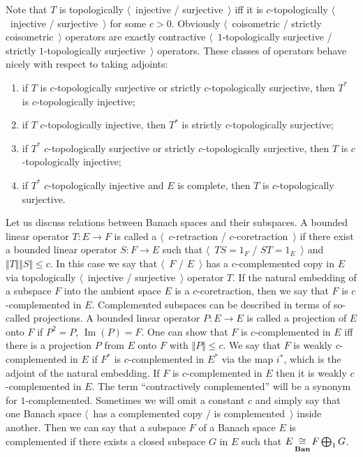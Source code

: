 Note that $T$ is topologically $\langle$~injective / surjective~$\rangle$ iff it
is $c$-topologically $\langle$~injective / surjective~$\rangle$ for some $c>0$.
Obviously $\langle$~coisometric / strictly coisometric~$\rangle$ operators are
exactly contractive $\langle$~$1$-topologically surjective / strictly
$1$-topologically surjective~$\rangle$ operators. These classes of operators 
behave nicely with respect to taking adjoints:

\begin{enumerate}[label = (\roman*)]
  \item if $ T$ is $c$-topologically surjective or strictly $c$-topologically 
  surjective, then $ T^*$ is $c$-topologically injective;

  \item if $ T$ $c$-topologically injective, then $ T^*$ is strictly
  $c$-topologically surjective;

  \item if $ T^*$ $c$-topologically surjective or strictly $c$-topologically 
  surjective, then $ T$ is $c$-topologically injective;

  \item if $T^*$ $c$-topologically injective and $E$ is complete, then $T$ 
  is $c$-topologically surjective.
\end{enumerate}

Let us discuss relations between Banach spaces and their subspaces. A bounded 
linear operator $T:E\to F$ is called a $\langle$~$c$-retraction /
$c$-coretraction~$\rangle$ if there exist a bounded linear operator $S:F\to E$
such that $\langle$~$T S=1_F$ / $S T=1_E$~$\rangle$ 
and $\Vert T\Vert\Vert S\Vert\leq c$. In this case we say 
that $\langle$~$F$ / $E$~$\rangle$ has a
$c$-complemented copy in $E$ via topologically $\langle$~injective /
surjective~$\rangle$ operator $T$. If the natural embedding of a subspace $F$
into the ambient space $E$ is a $c$-coretraction, then we say that $F$ is
$c$-complemented in $E$. Complemented subspaces can be described in terms of so-called 
projections. A bounded linear operator $P:E\to E$ is called a projection 
of $E$ onto $F$ if $P^2=P$, $\operatorname{Im}(P)=F$. One can show that 
$F$ is $c$-complemented in $E$ iff there is a projection $P$ from $E$ onto $F$ 
with $\Vert P\Vert\leq c$. We say that $F$ is weakly $c$-complemented in $E$
if $F^*$ is $c$-complemented in $E^*$ via the map $i^*$, which is the adjoint of
the natural embedding. If $F$ is $c$-complemented in $E$ then it is 
weakly $c$-complemented in $E$.  The term ``contractively complemented'' will 
be a synonym for $1$-complemented. Sometimes we will omit a constant $c$ and 
simply say that one Banach space $\langle$~has a complemented copy / 
is complemented~$\rangle$ inside another. Then we can say that a 
subspace $F$ of a Banach space $E$ is complemented if there exists a 
closed subspace $G$ in $E$ such that $E\mathop{\mathbin{\cong}}\limits_{\mathbf{Ban}}F\bigoplus_1 G$.

